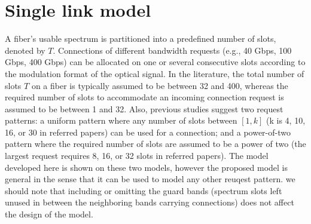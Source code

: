 \documentclass[letterpaper,10pt]{article}\pdfoutput=1
\begin{document}
\section{Single link model}
A fiber's usable spectrum is partitioned into a predefined number of slots, denoted by $T$. 
Connections of different bandwidth requests (e.g., 40 Gbps, 100 Gbps, 400 Gbps) can be allocated
on one or several consecutive slots according to the modulation format of the optical signal. 
In the literature, the total number of slots $T$ on a fiber is typically assumed to be between 32 and 400, 
whereas the required number of slots to accommodate an incoming connection request is assumed to be
between 1 and 32. Also, previous studies suggest two request patterns:
a uniform pattern where any number of slots between $[1,k]$ (k is 4, 10, 16, or 30 in referred papers) 
can be used\cite{chen,fun,chris} for a connection;
and a power-of-two pattern where the required number of slots are assumed to be a power of 
two\cite{almeida,castro} (the largest request requires 8, 16, or 32 slots in referred papers). 
The model developed here is shown on these two models,
however the proposed model is general in the sense that it can be used to model any other reuqest pattern. 
we should note that including or omitting the guard bands (spectrum slots left unused in between the neighboring 
bands carrying connections) does not affect the design of the model.
\end{document}
